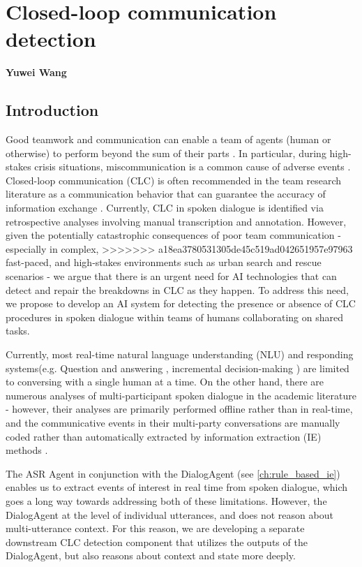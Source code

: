 \chapter{Closed-loop communication detection}
\label{ch:clc}
\textbf{Yuwei Wang}

\section{Introduction}

Good teamwork and communication can enable a team of agents (human or otherwise)
to perform beyond the sum of their parts \citep{roberts2022state}. In particular, 
during high-stakes crisis situations, miscommunication is a common cause of
adverse events \citep{taylor2014description,davis2017operative}. Closed-loop
communication (CLC) is often recommended in the team research literature
as a communication behavior that can guarantee the accuracy of information
exchange \citep{marzuki2019closed}. Currently, CLC in spoken dialogue is
identified via retrospective analyses involving manual transcription and
annotation. However, given the potentially catastrophic consequences of poor
team communication \citep{flin2004identifying} - especially in complex,
>>>>>>> a18ea3780531305de45c519ad042651957e97963
fast-paced, and high-stakes environments such as urban search and rescue
scenarios - we argue that there is an urgent need for AI technologies that can
detect and repair the breakdowns in CLC as they happen. To address this need,
we propose to develop an AI system for detecting the presence or absence of CLC
procedures in spoken dialogue within teams of humans collaborating on shared
tasks.

Currently, most real-time natural language understanding (NLU) and responding systems(e.g. Question and
answering \citep{hawkins_goodman_2017}, incremental
decision-making \citep{devault2011detecting}) are limited to conversing with a
single human at a time. On the other hand, there are numerous analyses of
multi-participant spoken dialogue in the academic literature - however, their
analyses are primarily performed offline rather than in real-time, and the communicative events in their multi-party conversations are manually coded rather than automatically extracted by information extraction (IE) methods \citep{jagannath2022speech}.

The ASR Agent in conjunction with the DialogAgent (see \autoref{ch:rule_based_ie})
enables us to extract events of interest in real time from spoken dialogue,
which goes a long way towards addressing both of these limitations. However,
the DialogAgent at the level of individual utterances, and does not reason
about multi-utterance context. For this reason, we are developing a separate downstream
CLC detection component that utilizes the outputs of the DialogAgent, but also
reasons about context and state more deeply.


